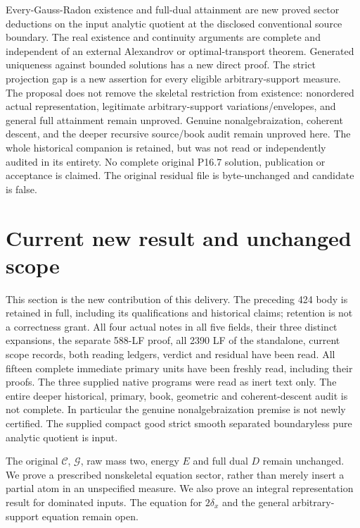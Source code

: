 \documentclass[11pt]{article}
\newcommand{\C}{\mathcal C}
\begin{document}
Every-Gauss-Radon existence and full-dual attainment are new proved
sector deductions on the input analytic quotient at the disclosed
conventional source boundary. The real existence and continuity
arguments are complete and independent of an external Alexandrov or
optimal-transport theorem. Generated uniqueness against bounded
solutions has a new direct proof. The strict projection gap is a
new assertion for every eligible arbitrary-support measure.
The proposal does not remove the skeletal restriction from existence:
nonordered actual representation, legitimate arbitrary-support
variations/envelopes, and general full attainment remain unproved.
Genuine nonalgebraization, coherent descent, and the deeper recursive
source/book audit remain unproved here. The whole historical companion
is retained, but was not read or independently audited in its entirety.
No complete original P16.7 solution, publication or acceptance is
claimed. The original residual file is byte-unchanged and candidate
is false.

\section{Current new result and unchanged scope}
This section is the new contribution of this delivery. The preceding
424 body is retained in full, including its qualifications and historical
claims; retention is not a correctness grant. All four actual notes in
all five fields, their three distinct expansions, the separate 588-LF
proof, all 2390 LF of the standalone, current scope records, both reading
ledgers, verdict and residual have been read. All fifteen complete
immediate primary units have been freshly read, including their proofs.
The three supplied native programs were read as inert text only.
The entire deeper historical, primary, book, geometric and coherent-descent
audit is not complete. In particular the genuine nonalgebraization premise
is not newly certified. The supplied compact good strict smooth separated
boundaryless pure analytic quotient is input.

The original $\C$, $\mathcal G$, raw mass two, energy $E$ and full
dual $D$ remain unchanged. We prove a prescribed nonskeletal equation
sector, rather than merely insert a partial atom in an unspecified measure.
We also prove an integral representation result for dominated inputs.
The equation for $2\delta_x$ and the general arbitrary-support equation
remain open.
\end{document}
